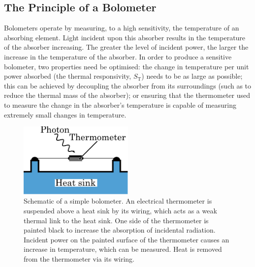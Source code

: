 \subsection{The Principle of a Bolometer} \label{ssec:principleBolometer}
Bolometers operate by measuring, to a high sensitivity, the temperature of an absorbing element. Light incident upon this absorber results in the temperature of the absorber increasing. The greater the level of incident power, the larger the increase in the temperature of the absorber. In order to produce a sensitive bolometer, two properties need be optimised: the change in temperature per unit power absorbed (the thermal responsivity, $S_{\mathrm{T}}$) needs to be as large as possible; this can be achieved by decoupling the absorber from its surroundings (such as to reduce the thermal mass of the absorber); or ensuring that the thermometer used to measure the change in the absorber's temperature is capable of measuring extremely small changes in temperature.
\begin{figure}[t]
\begin{center}
\includegraphics[width = 0.5\textwidth]{figures/simple_bolometer}
\caption[Schematic of a simple bolometer]{Schematic of a simple bolometer. An electrical thermometer is suspended above a heat sink by its wiring, which acts as a weak thermal link to the heat sink. One side of the thermometer is painted black to increase the absorption of incidental radiation. Incident power on the painted surface of the thermometer causes an increase in temperature, which can be measured. Heat is removed from the thermometer via its wiring.}
\label{fig:simpleBolometer}
\end{center}
\end{figure}
\par 
